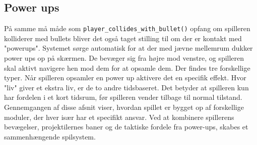\vspace{0.5em}
\subsection{Power ups} \label{chap:ProduktUdvikling_sec:powerups}
\vspace{0.5em}

På samme må måde som \lstinline!player_collides_with_bullet()! opfang om spilleren kolliderer med bullets bliver det også taget stilling til om der er kontakt med "powerups". Systemet sørge automatisk for at der med jævne mellemrum dukker power ups op på skærmen. De bevæger sig fra højre mod venstre, og spilleren skal aktivt navigere hen mod dem for at opsamle dem. Der findes tre forskellige typer. Når spilleren opsamler en power up aktivere det en specifik effekt. Hvor "liv" giver et ekstra liv, er de to andre tidsbaseret. Det betyder at spilleren kun har fordelen i et kort tidsrum, før spilleren vender tilbage til normal tilstand. Gennemgangen af disse afsnit viser, hvordan spillet er bygget op af forskellige moduler, der hver især har et specifikt ansvar. Ved at kombinere spillerens bevægelser, projektilernes baner og de taktiske fordele fra power-ups, skabes et sammenhængende spilsystem.